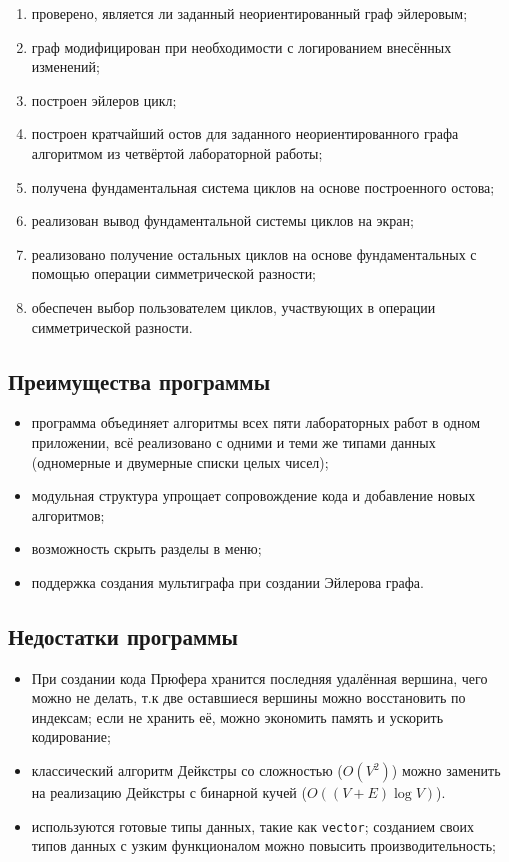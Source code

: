 \documentclass[14pt,a4paper]{extarticle}
\newcommand{\code}[1]{\texttt{#1}}
\begin{document}
\begin{enumerate}[start=30]
    \item проверено, является ли заданный неориентированный граф эйлеровым;
    \item граф модифицирован при необходимости с логированием внесённых изменений;
    \item построен эйлеров цикл;
    \item построен кратчайший остов для заданного неориентированного графа алгоритмом из четвёртой лабораторной работы;
    \item получена фундаментальная система циклов на основе построенного остова;
    \item реализован вывод фундаментальной системы циклов на экран;
    \item реализовано получение остальных циклов на основе фундаментальных с помощью операции симметрической разности;
    \item обеспечен выбор пользователем циклов, участвующих в операции симметрической разности.
\end{enumerate}

\subsection{Преимущества программы}

\begin{itemize}
    \item программа объединяет алгоритмы всех пяти лабораторных работ в одном приложении, всё реализовано с одними и теми же типами данных (одномерные и двумерные списки целых чисел);
    \item модульная структура упрощает сопровождение кода и добавление новых алгоритмов;
    \item возможность скрыть разделы в меню;
    \item поддержка создания мультиграфа при создании Эйлерова графа.
\end{itemize}

\subsection{Недостатки программы}

\begin{itemize}
    \item При создании кода Прюфера хранится последняя удалённая вершина, чего можно не делать, т.к две оставшиеся вершины можно восстановить по индексам; если не хранить её, можно экономить память и ускорить кодирование;
    \item классический алгоритм Дейкстры со сложностью ($O(V^2)$) можно заменить на реализацию Дейкстры с бинарной кучей ($O((V+E)\log{V})$). 
    \item используются готовые типы данных, такие как \code{vector}; созданием своих типов данных с узким функционалом можно повысить производительность;
\end{itemize}
\end{document}
